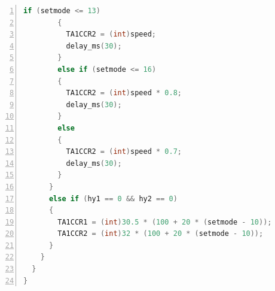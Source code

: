 \documentclass[a4paper,twoside,zihao=5,UTF8]{ctexart}
\begin{document}
\begin{spacing}{1.2}
\begin{lstlisting}[language=c++,numbers=left,style=CppStyle,caption=作业6,label={code:carctl}]
        if (setmode <= 13)
        {
          TA1CCR2 = (int)speed;
          delay_ms(30);
        }
        else if (setmode <= 16)
        {
          TA1CCR2 = (int)speed * 0.8;
          delay_ms(30);
        }
        else
        {
          TA1CCR2 = (int)speed * 0.7;
          delay_ms(30);
        }
      }
      else if (hy1 == 0 && hy2 == 0)
      {
        TA1CCR1 = (int)30.5 * (100 + 20 * (setmode - 10));
        TA1CCR2 = (int)32 * (100 + 20 * (setmode - 10));
      }
    }
  }
}
\end{lstlisting}


\end{spacing}
\end{document}
